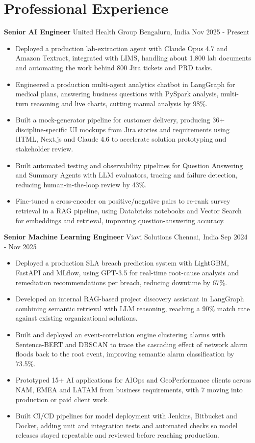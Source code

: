 \documentclass[10pt,a4paper]{article}
\newcommand{\role}[4]{\textbf{#1} \textbar{} #2 \hfill #3 \textbar{} #4\par}
\begin{document}
\section{Professional Experience}
\role{Senior AI Engineer}{United Health Group}{Bengaluru, India}{Nov 2025 - Present}
\begin{itemize}
  \item Deployed a production lab-extraction agent with Claude Opus 4.7 and Amazon Textract, integrated with LIMS, handling about 1,800 lab documents and automating the work behind 800 Jira tickets and PRD tasks.
  \item Engineered a production multi-agent analytics chatbot in LangGraph for medical plans, answering business questions with PySpark analysis, multi-turn reasoning and live charts, cutting manual analysis by 98\%.
  \item Built a mock-generator pipeline for customer delivery, producing 36+ discipline-specific UI mockups from Jira stories and requirements using HTML, Next.js and Claude 4.6 to accelerate solution prototyping and stakeholder review.
  \item Built automated testing and observability pipelines for Question Answering and Summary Agents with LLM evaluators, tracing and failure detection, reducing human-in-the-loop review by 43\%.
  \item Fine-tuned a cross-encoder on positive/negative pairs to re-rank survey retrieval in a RAG pipeline, using Databricks notebooks and Vector Search for embeddings and retrieval, improving question-answering accuracy.
\end{itemize}
\vspace{3pt}
\role{Senior Machine Learning Engineer}{Viavi Solutions}{Chennai, India}{Sep 2024 - Nov 2025}
\begin{itemize}
  \item Deployed a production SLA breach prediction system with LightGBM, FastAPI and MLflow, using GPT-3.5 for real-time root-cause analysis and remediation recommendations per breach, reducing downtime by 67\%.
  \item Developed an internal RAG-based project discovery assistant in LangGraph combining semantic retrieval with LLM reasoning, reaching a 90\% match rate against existing organizational solutions.
  \item Built and deployed an event-correlation engine clustering alarms with Sentence-BERT and DBSCAN to trace the cascading effect of network alarm floods back to the root event, improving semantic alarm classification by 73.5\%.
  \item Prototyped 15+ AI applications for AIOps and GeoPerformance clients across NAM, EMEA and LATAM from business requirements, with 7 moving into production or paid client work.
  \item Built CI/CD pipelines for model deployment with Jenkins, Bitbucket and Docker, adding unit and integration tests and automated checks so model releases stayed repeatable and reviewed before reaching production.
\end{itemize}
\end{document}
